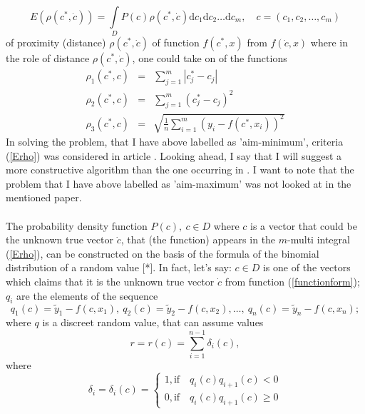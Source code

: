 \documentclass[11pt,a4paper]{article}
\numberwithin{equation}{subsection}
\begin{document}
\begin{equation}
E(\rho(c^{*},\dot{c}))= \int\limits_{D}P(c)\rho(c^{*},\dot{c})\mathrm{d}c_{1}\mathrm{d}c_{2}\dots \mathrm{d}c_{m}, \quad c = (c_{1},c_{2},\dots,c_{m}) \label{Erho}
\end{equation}
of proximity (distance) $\rho(c^{*},\dot{c})$ of function $f(c^{*},x)$ from $f(\dot{c},x)$ where in the role of distance $\rho(c^{*},\dot{c})$, one could take on of the functions
\begin{eqnarray}
\rho_{1}(c^{*},c) &=& \sum\limits_{j=1}^{m} \left| c_{j}^{*}-c_{j} \right| \label{rho1}\\
\rho_{2}(c^{*},c) &=& \sum\limits_{j=1}^{m} \left( c_{j}^{*}-c_{j} \right)^{2} \label{rho2}\\
\rho_{3}(c^{*},c) &=& \sqrt{\frac{1}{n}\sum\limits_{i=1}^{m} \left( y_{i}-f(c^{*},x_{i}) \right)^{2}} \label{rho3}
\end{eqnarray}
In solving the problem, that I have above labelled as 'aim-minimum', criteria (\ref{Erho}) was considered in article \cite{balk2010regression}. Looking ahead, I say that I will suggest a more constructive algorithm than the one occurring in \cite{balk2010regression}. I want to note that the problem that I have above labelled as 'aim-maximum' was not looked at in the mentioned paper. \\
\\
The probability density function $P(c),\  c \in D$ where $c$ is a vector that could be the unknown true vector $\dot{c}$, that (the function) appears in the $m$-multi integral (\ref{Erho}), can be constructed on the basis of the formula of the binomial distribution of a random value [*]. In fact, let's say: $c \in D$ is one of the vectors which claims that it is the unknown true vector $ \dot{c}$ from function (\ref{functionform}); $q_{i}$ are the elements of the sequence
\begin{equation}
q_{1}(c)=\tilde{y}_{1}-f(c,x_{1}),\ q_{2}(c)=\tilde{y}_{2}-f(c,x_{2}), \dots, \ q_{n}(c)=\tilde{y}_{n}-f(c,x_{n}); \label{sequence}
\end{equation}
where $q$ is a discreet random value, that can assume values
\begin{equation}
r=r(c)=\sum\limits_{i=1}^{n-1} \delta_{i}(c), \label{eq-values-of-q}
\end{equation}
where
\begin{equation}
\delta_{i}=\delta_{i}(c)=
\begin{cases} 
      1, \mathrm{if} \quad q_{i}(c)q_{i+1}(c)<0\\
      0, \mathrm{if} \quad q_{i}(c)q_{i+1}(c)\geq 0
   \end{cases}
\end{equation}
\end{document}
